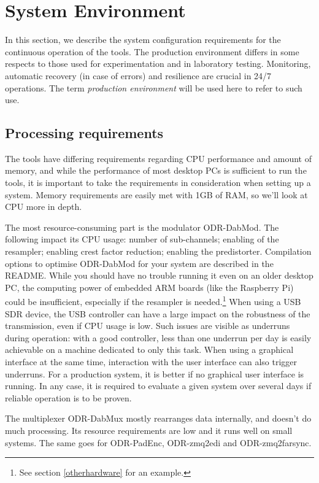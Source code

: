 \section{System Environment}

In this section, we describe the system configuration requirements for the
continuous operation of the tools. The production environment differs in some
respects to those used for experimentation and in laboratory testing. Monitoring,
automatic recovery (in case of errors) and resilience are crucial in 24/7
operations. The term \emph{production environment} will be used here to refer to
such use.

\subsection{Processing requirements}

The tools have differing requirements regarding CPU performance and amount of
memory, and while the performance of most desktop PCs is sufficient to run the
tools, it is important to take the requirements in consideration when setting up
a system.
Memory requirements are easily met with 1GB of RAM, so we'll look at CPU more in
depth.

The most resource-consuming part is the modulator ODR-DabMod. The
following impact its CPU usage: number of sub-channels; enabling of the
resampler; enabling crest factor reduction; enabling the predistorter.
Compilation options to optimise ODR-DabMod for your system are described in the
README. While you should have no trouble running it even on an older desktop PC,
the computing power of embedded ARM boards (like the Raspberry Pi) could be
insufficient, especially if the resampler is needed.\footnote{See section
\ref{otherhardware} for an example.}
When using a USB SDR device, the USB controller can have a large impact on the
robustness of the transmission, even if CPU usage is low. Such issues are visible as
underruns during operation: with a good controller, less than one underrun per
day is easily achievable on a machine dedicated to only this task. When using
a graphical interface at the same time, interaction with the user interface can
also trigger underruns. For a production system, it is better if no graphical
user interface is running.
In any case, it is required to evaluate a given system over several days if
reliable operation is to be proven.

The multiplexer ODR-DabMux mostly rearranges data internally, and doesn't do
much processing. Its resource requirements are low and it runs well on small
systems. The same goes for ODR-PadEnc, ODR-zmq2edi and ODR-zmq2farsync.

